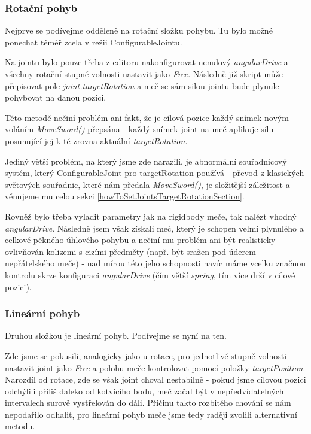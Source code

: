 \subsubsection*{Rotační pohyb} \label{implementationSwordAngularMovementSubsubsection}

Nejprve se podívejme odděleně na rotační složku pohybu. Tu bylo možné ponechat téměř zcela v režii ConfigurableJointu.

Na jointu bylo pouze třeba z editoru nakonfigurovat nenulový \textit{angularDrive} a všechny rotační stupně volnosti nastavit jako \textit{Free}. Následně již skript může přepisovat pole \textit{joint.targetRotation} a meč se sám silou jointu bude plynule pohybovat na danou pozici.

Této metodě nečiní problém ani fakt, že je cílová pozice každý snímek novým voláním \textit{MoveSword()} přepsána - každý snímek joint na meč aplikuje sílu posunující jej k té zrovna aktuální \textit{targetRotation}. 

Jediný větší problém, na který jsme zde narazili, je abnormální souřadnicový systém, který ConfigurableJoint pro targetRotation používá - převod z klasických světových souřadnic, které nám předala \textit{MoveSword()}, je složitější záležitost a věnujeme mu celou sekci \ref{howToSetJointsTargetRotationSection}. 

Rovněž bylo třeba vyladit parametry jak na rigidbody meče, tak nalézt vhodný \textit{angularDrive}. Následně jsem však získali meč, který je schopen velmi plynulého a celkově pěkného úhlového pohybu a nečiní mu problém ani být realisticky ovlivňován kolizemi s cizími předměty (např. být sražen pod úderem nepřátelského meče) - nad mírou této jeho schopnosti navíc máme vcelku značnou kontrolu skrze konfiguraci \textit{angularDrive} (čím větší \textit{spring}, tím více drží v cílové pozici).

\subsubsection*{Lineární pohyb}

Druhou složkou je lineární pohyb. Podívejme se nyní na ten.

Zde jsme se pokusili, analogicky jako u rotace, pro jednotlivé stupně volnosti nastavit joint jako \textit{Free} a polohu meče kontrolovat pomocí položky \textit{targetPosition}. Narozdíl od rotace, zde se však joint choval nestabilně - pokud jsme cílovou pozici odchýlili příliš daleko od kotvícího bodu, meč začal být v nepředvídatelných intervalech surově vystřelován do dáli. Příčinu takto rozbitého chování se nám nepodařilo odhalit, pro lineární pohyb meče jsme tedy raději zvolili alternativní metodu. 

